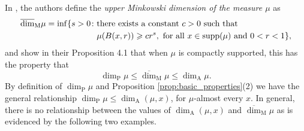 \documentclass{PRM}
\newcommand{\updim}{\overline{\dim}}
\newcommand{\adim}{\dim_{\mathrm{A}}}
\theoremstyle{plain}
\theoremstyle{definition}
\theoremstyle{remark}
\begin{document}
In \cite{KFF}, the authors define the \emph{upper Minkowski dimension of the measure $\mu$} as
\begin{align*}
    \updim_{\mathrm{M}}\mu=\inf\{s>0\colon &\textnormal{there exists a constant }c>0\textnormal{ such that}\\
    &\mu(B(x,r))\geq cr^s,  \textnormal{ for all }x\in \text{supp}(\mu)\textnormal{ and }0<r<1\},
\end{align*}
and show in their Proposition 4.1 that when $\mu$ is compactly supported, this has the property that
\begin{equation*}
    \dim_{\mathrm{P}}\mu\leq \updim_{\mathrm{M}}\mu\leq \dim_{\mathrm{A}}\mu.
\end{equation*}
By definition of $\dim_{\mathrm{P}}\mu$ and Proposition \ref{prop:basic_properties}(2) we have the general relationship $\dim_{\mathrm{P}}\mu\leq\dim_{\mathrm{A}}(\mu,x)$, for $\mu$-almost every $x$. In general, there is no relationship between the values of $\adim(\mu,x)$ and $\updim_{\mathrm{M}}\mu$ as is evidenced by the following two examples.
\end{document}
